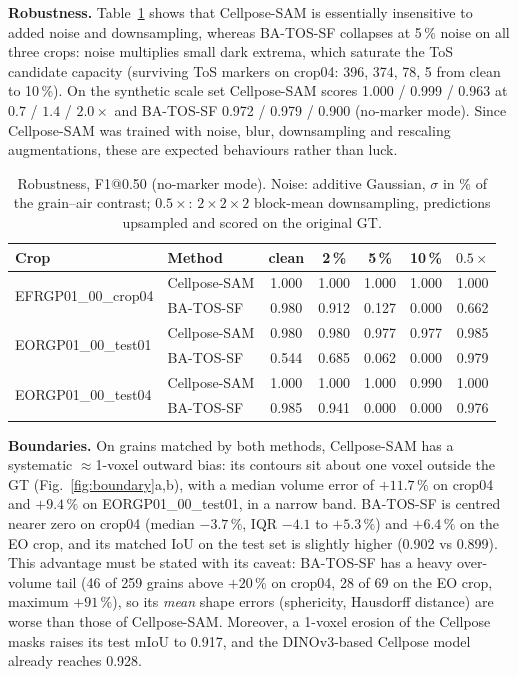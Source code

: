 \documentclass[12pt]{article}
\newcommand{\SF}{BA-TOS-SF}
\newcommand{\CP}{Cellpose-SAM}
\begin{document}
\textbf{Robustness.} Table~\ref{tab:robust} shows that \CP{} is essentially insensitive to added noise and
downsampling, whereas \SF{} collapses at 5\,\% noise on all three crops: noise multiplies small dark extrema, which
saturate the ToS candidate capacity (surviving ToS markers on crop04: 396, 374, 78, 5 from clean to 10\,\%). On
the synthetic scale set \CP{} scores 1.000 / 0.999 / 0.963 at $0.7$ / $1.4$ / $2.0\times$ and \SF{} 0.972 / 0.979
/ 0.900 (no-marker mode). Since Cellpose-SAM was trained with noise, blur, downsampling and rescaling augmentations,
these are expected behaviours rather than luck.

\begin{table}[t]
\centering
\caption{Robustness, F1@0.50 (no-marker mode). Noise: additive Gaussian, $\sigma$ in \% of the grain--air contrast;
$0.5\times$: $2\times2\times2$ block-mean downsampling, predictions upsampled and scored on the original GT.}
\label{tab:robust}
\small
\begin{tabular}{llccccc}
\toprule
Crop & Method & clean & 2\,\% & 5\,\% & 10\,\% & $0.5\times$ \\
\midrule
\multirow{2}{*}{EFRGP01\_00\_crop04} & \CP & 1.000 & 1.000 & 1.000 & 1.000 & 1.000 \\
 & \SF & 0.980 & 0.912 & 0.127 & 0.000 & 0.662 \\
\multirow{2}{*}{EORGP01\_00\_test01} & \CP & 0.980 & 0.980 & 0.977 & 0.977 & 0.985 \\
 & \SF & 0.544 & 0.685 & 0.062 & 0.000 & 0.979 \\
\multirow{2}{*}{EORGP01\_00\_test04} & \CP & 1.000 & 1.000 & 1.000 & 0.990 & 1.000 \\
 & \SF & 0.985 & 0.941 & 0.000 & 0.000 & 0.976 \\
\bottomrule
\end{tabular}
\end{table}

\textbf{Boundaries.} On grains matched by both methods, \CP{} has a systematic $\approx$1-voxel outward bias: its
contours sit about one voxel outside the GT (Fig.~\ref{fig:boundary}a,b), with a median volume error of $+11.7\,\%$
on crop04 and $+9.4\,\%$ on EORGP01\_00\_test01, in a narrow band. \SF{} is centred nearer zero on crop04 (median
$-3.7\,\%$, IQR $-4.1$ to $+5.3\,\%$) and $+6.4\,\%$ on the EO crop, and its matched IoU on the test set is
slightly higher (0.902 vs 0.899). This advantage must be stated with its caveat: \SF{} has a heavy over-volume tail
(46 of 259 grains above $+20\,\%$ on crop04, 28 of 69 on the EO crop, maximum $+91\,\%$), so its \emph{mean} shape
errors (sphericity, Hausdorff distance) are worse than those of \CP. Moreover, a 1-voxel erosion of the Cellpose
masks raises its test mIoU to 0.917, and the DINOv3-based Cellpose model already reaches 0.928.
\end{document}
